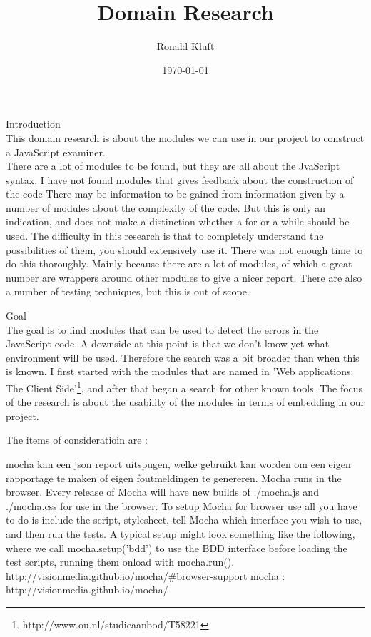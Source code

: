 \documentclass{article}
\begin{document}
\title{Domain Research}
\author{Ronald Kluft}
\date{\today}
\maketitle

\begin{description}
\item
Introduction\\
This domain research is about the modules we can use in our project to construct a JavaScript examiner.\\
There are a lot of modules to be found, but they are all about the JvaScript syntax.
I have not found modules that gives feedback about the construction of the code
There may be information to be gained from information given by a number of modules about the complexity of the code. 
But this is only an indication, and does not make a distinction whether a for or a while should be used.
The difficulty in this research is that to completely understand the possibilities of them, you should extensively use it.
There was not enough time to do this thoroughly.
Mainly because there are a lot of modules, of which a great number are wrappers around other modules to give a nicer report.
There are also a number of testing techniques, but this is out of scope.

\item
Goal\\
The goal is to find modules that can be used to detect the errors in the JavaScript code.
A downside at this point is that we don't know yet what environment will be used.
Therefore the search was a bit broader than when this is known.
I first started with the modules that are named in 'Web applications: The Client Side'\footnote{http://www.ou.nl/studieaanbod/T58221}, and after that began a search for other known tools.
The focus of the research is about the usability of the modules in terms of embedding in our project.

The items of consideratioin are :\\
\item[The name of the module]
\item[The location]
\item[What is does]
\item[omgeving?]
\item[Configurability]
\item[Output]

\item[Mocha]
mocha kan een json report uitspugen, welke gebruikt kan worden om een eigen rapportage te maken of eigen foutmeldingen te genereren.
Mocha runs in the browser. Every release of Mocha will have new builds of ./mocha.js and ./mocha.css for use in the browser. To setup Mocha for browser use all you have to do is include the script, stylesheet, tell Mocha which interface you wish to use, and then run the tests.
A typical setup might look something like the following, where we call mocha.setup('bdd') to use the BDD interface before loading the test scripts, running them onload with mocha.run().\\
http://visionmedia.github.io/mocha/\#browser-support
mocha : http://visionmedia.github.io/mocha/


\end{description}
\end{document}
